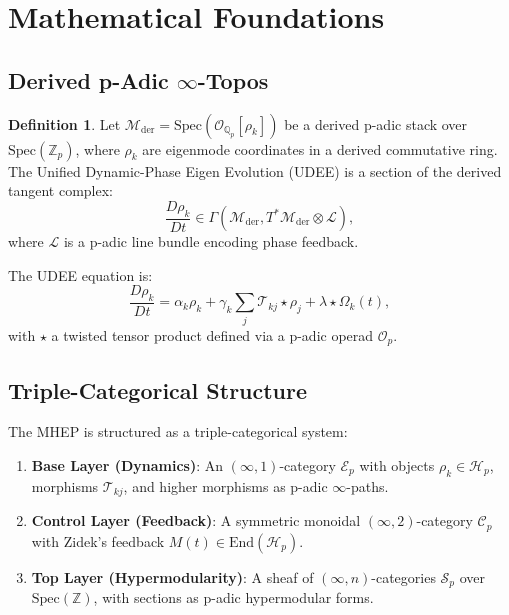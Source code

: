 \documentclass[11pt]{article}
\theoremstyle{plain}
\theoremstyle{definition}
\newtheorem{definition}{Definition}[section]
\begin{document}
\section{Mathematical Foundations}

\subsection{Derived p-Adic \(\infty\)-Topos}
\begin{definition}
Let \(\mathcal{M}_{\text{der}} = \text{Spec}(\mathcal{O}_{\mathbb{Q}_p}[\rho_k])\) be a derived p-adic stack over \(\text{Spec}(\mathbb{Z}_p)\), where \(\rho_k\) are eigenmode coordinates in a derived commutative ring. The Unified Dynamic-Phase Eigen Evolution (UDEE) is a section of the derived tangent complex:
\[
\frac{D\rho_k}{Dt} \in \Gamma(\mathcal{M}_{\text{der}}, T^*\mathcal{M}_{\text{der}} \otimes \mathcal{L}),
\]
where \(\mathcal{L}\) is a p-adic line bundle encoding phase feedback.
\end{definition}

The UDEE equation is:
\begin{equation}
\frac{D\rho_k}{Dt} = \alpha_k \rho_k + \gamma_k \sum_j \mathcal{T}_{kj} \star \rho_j + \lambda \star \Omega_k(t),
\end{equation}
with \(\star\) a twisted tensor product defined via a p-adic operad \(\mathcal{O}_p\).

\subsection{Triple-Categorical Structure}
The MHEP is structured as a triple-categorical system:
\begin{enumerate}
    \item \textbf{Base Layer (Dynamics)}: An \((\infty,1)\)-category \(\mathcal{E}_p\) with objects \(\rho_k \in \mathcal{H}_p\), morphisms \(\mathcal{T}_{kj}\), and higher morphisms as p-adic \(\infty\)-paths.
    \item \textbf{Control Layer (Feedback)}: A symmetric monoidal \((\infty,2)\)-category \(\mathcal{C}_p\) with Zidek’s feedback \(M(t) \in \text{End}(\mathcal{H}_p)\).
    \item \textbf{Top Layer (Hypermodularity)}: A sheaf of \((\infty,n)\)-categories \(\mathcal{S}_p\) over \(\text{Spec}(\mathbb{Z})\), with sections as p-adic hypermodular forms.
\end{enumerate}
\end{document}
